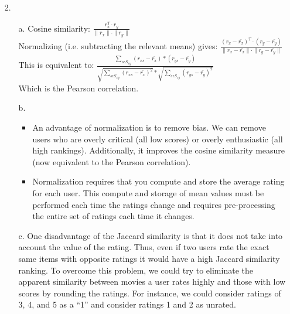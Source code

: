 \documentclass{article}
\begin{document}
\begin{itemize}
\pagebreak
\setlength{\headsep}{5pt}
\item[2.]
	\begin{itemize}
		\item[a.] Cosine similarity: $\frac{r_{x}^{T}\cdot r_{y}}{\parallel r_{x} \parallel \cdot \parallel r_{y} \parallel}$\\
		Normalizing (i.e. subtracting the relevant means) gives:
			$\frac{(r_{x} - \bar{r_{x}})^{T}\cdot (r_{y}-\bar{r_{y}})}{\parallel r_{x} - \bar{r_{x}} \parallel \cdot \parallel r_{y}-\bar{r_{y}} \parallel}$\\
		 This is equivalent to: 
		 	$\frac{\sum_{s \epsilon S_{xy}} (r_{xs} - \bar{r_{x}})*(r_{ys}-\bar{r_{y}})}{\sqrt{\sum_{s \epsilon S_{xy}} (r_{xs} - \bar{r_{x}})^{2}} * \sqrt{\sum_{s \epsilon S_{xy}} (r_{ys}-\bar{r_{y}})^{2}}}$\\
		 	Which is the Pearson correlation.
		\item[b.] 
			\begin{itemize}
				\item An advantage of normalization is to remove bias. We can remove users who are overly critical (all low scores) or overly enthusiastic (all high rankings). Additionally, it improves the cosine similarity measure (now equivalent to the Pearson correlation).
				\item Normalization requires that you compute and store the average rating for each user. This compute and storage of mean values must be performed each time the ratings change and requires pre-processing the entire set of ratings each time it changes.
			\end{itemize}
		\item[c.] One disadvantage of the Jaccard similarity is that it does not take into account the value of the rating. Thus, even if two users rate the exact same items with opposite ratings it would have a high Jaccard similarity ranking. To overcome this problem, we could try to eliminate the apparent similarity between movies a user rates highly and those with low scores by rounding the ratings. For instance, we could consider ratings of 3, 4, and 5 as a ``1'' and consider ratings 1 and 2 as unrated.
	\end{itemize}
	

\end{itemize}
\end{document}
